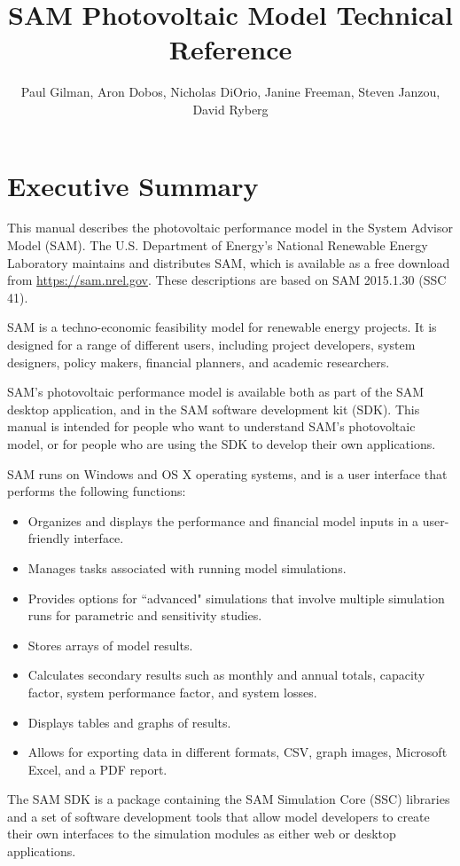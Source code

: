 \documentclass[12pt,letterpaper]{article}
\title{SAM Photovoltaic Model Technical Reference}
\author{Paul Gilman, Aron Dobos, Nicholas DiOrio, Janine Freeman, Steven Janzou, David Ryberg}
\begin{document}
\frontmatter
\chapter*{Executive Summary}

This manual describes the photovoltaic performance model in the System Advisor Model (SAM). The U.S. Department of Energy's National Renewable Energy Laboratory maintains and distributes SAM, which is available as a free download from \url{https://sam.nrel.gov}. These descriptions are based on SAM 2015.1.30 (SSC 41).

SAM is a techno-economic feasibility model for renewable energy projects. It is designed for a range of different users, including project developers, system designers, policy makers, financial planners, and academic researchers.

SAM's photovoltaic performance model is available both as part of the SAM desktop application, and in the SAM software development kit (SDK). This manual is intended for people who want to understand SAM's photovoltaic model, or for people who are using the SDK to develop their own applications.

SAM runs on Windows and OS X operating systems, and is a user interface that performs the following functions:

\begin{itemize}
\item Organizes and displays the performance and financial model inputs in a user-friendly interface.
\item Manages tasks associated with running model simulations.
\item Provides options for ``advanced" simulations that involve multiple simulation runs for parametric and sensitivity studies.
\item Stores arrays of model results.
\item Calculates secondary results such as monthly and annual totals, capacity factor, system performance factor, and system losses.
\item Displays tables and graphs of results.
\item Allows for exporting data in different formats, CSV, graph images, Microsoft Excel, and a PDF report.
\end{itemize}

The SAM SDK is a package containing the SAM Simulation Core (SSC) libraries and a set of software development tools that allow model developers to create their own interfaces to the simulation modules as either web or desktop applications.
\end{document}
